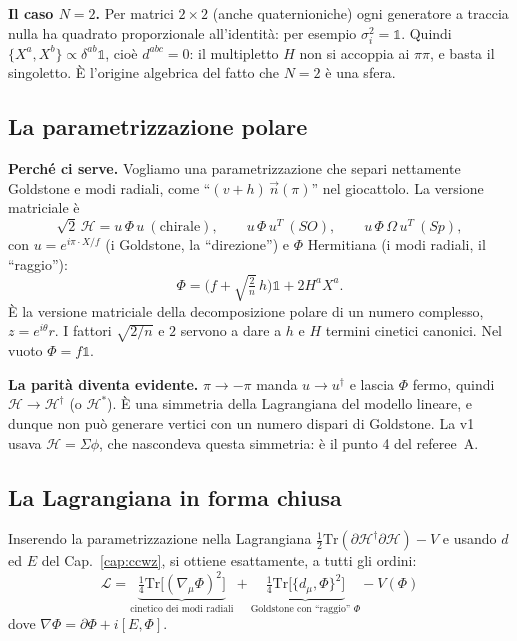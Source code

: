 \documentclass[11pt,a4paper]{article}
\numberwithin{equation}{section}
\theoremstyle{remark}
\newcommand{\Tr}{\mathrm{Tr}}
\newcommand{\Hf}{\mathcal{H}}
\newcommand{\one}{\mathbb{1}}
\begin{document}
\textbf{Il caso $N=2$.} Per matrici $2\times2$ (anche quaternioniche) ogni generatore a traccia nulla ha quadrato proporzionale all'identità: per esempio $\sigma_i^2=\one$. Quindi $\{X^a,X^b\}\propto\delta^{ab}\one$, cioè $d^{abc}=0$: il multipletto $H$ non si accoppia ai $\pi\pi$, e basta il singoletto. È l'origine algebrica del fatto che $N=2$ è una sfera.

\subsection{La parametrizzazione polare}

\textbf{Perché ci serve.} Vogliamo una parametrizzazione che separi nettamente Goldstone e modi radiali, come ``$(v+h)\,\vec n(\pi)$'' nel giocattolo. La versione matriciale è
\begin{equation}
\sqrt2\,\Hf=u\,\Phi\,u\ (\text{chirale}),\qquad u\,\Phi\,u^T\ (SO),\qquad u\,\Phi\,\Omega\,u^T\ (Sp),
\end{equation}
con $u=e^{i\pi\cdot X/f}$ (i Goldstone, la ``direzione'') e $\Phi$ Hermitiana (i modi radiali, il ``raggio''):
\begin{equation}
\Phi=\Big(f+\sqrt{\tfrac2n}\,h\Big)\one+2H^aX^a .
\end{equation}
È la versione matriciale della decomposizione polare di un numero complesso, $z=e^{i\theta}r$. I fattori $\sqrt{2/n}$ e $2$ servono a dare a $h$ e $H$ termini cinetici canonici. Nel vuoto $\Phi=f\one$.

\textbf{La parità diventa evidente.} $\pi\to-\pi$ manda $u\to u^\dagger$ e lascia $\Phi$ fermo, quindi $\Hf\to\Hf^\dagger$ (o $\Hf^*$). È una simmetria della Lagrangiana del modello lineare, e dunque non può generare vertici con un numero dispari di Goldstone. La v1 usava $\Hf=\Sigma\phi$, che nascondeva questa simmetria: è il punto 4 del referee~A.

\subsection{La Lagrangiana in forma chiusa}

Inserendo la parametrizzazione nella Lagrangiana $\frac12\Tr(\partial\Hf^\dagger\partial\Hf)-V$ e usando $d$ ed $E$ del Cap.~\ref{cap:ccwz}, si ottiene esattamente, a tutti gli ordini:
\begin{equation}
\boxed{\;\mathcal L=\underbrace{\tfrac14\Tr\big[(\nabla_\mu\Phi)^2\big]}_{\text{cinetico dei modi radiali}}+\underbrace{\tfrac14\Tr\big[\{d_\mu,\Phi\}^2\big]}_{\text{Goldstone con ``raggio'' }\Phi}-V(\Phi)\;}
\label{eq:master}
\end{equation}
dove $\nabla\Phi=\partial\Phi+i[E,\Phi]$.
\end{document}
